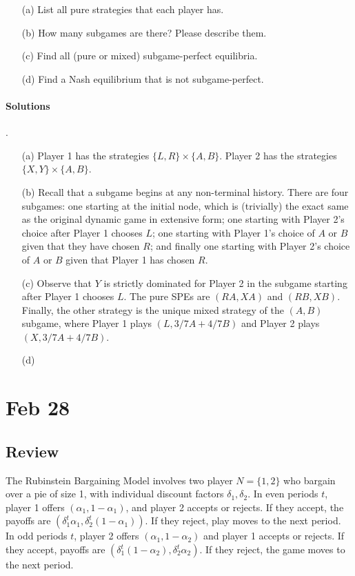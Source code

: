 \documentclass[10pt]{article}
\begin{document}
\begin{itemize}
	\item[(a)] List all pure strategies that each player has.
	\item[(b)] How many subgames are there? Please describe them.
	\item[(c)] Find all (pure or mixed) subgame-perfect equilibria.
	\item[(d)] Find a Nash equilibrium that is not subgame-perfect.
\end{itemize}

\paragraph{Solutions}.

\begin{itemize}
	\item[(a)] Player 1 has the strategies  $\{L,R\} \times \{A,B\}$. Player 2 has the strategies $\{X,Y\} \times \{A,B\}$.
	\item[(b)] Recall that a subgame begins at any non-terminal history. There are four subgames: one starting at the initial node, which is (trivially) the exact same as the original dynamic game in extensive form; one starting with Player 2's choice after Player 1 chooses $L$; one starting with Player 1's choice of $A$ or $B$ given that they have chosen $R$; and finally one starting with Player 2's choice of $A$ or $B$ given that Player 1 has chosen $R$.
	\item[(c)] Observe that $Y$ is strictly dominated for Player 2 in the subgame starting after Player 1 chooses $L$. The pure SPEs are $(RA,XA)$ and $(RB,XB)$. Finally, the other strategy is the unique mixed strategy of the $(A,B)$ subgame, where Player 1 plays $(L, 3/7 A + 4/7 B)$ and Player 2 plays $(X, 3/7 A + 4/7 B)$.
	\item[(d)] 
\end{itemize}


\section{Feb 28}

\subsection{Review}

\begin{model}
	The Rubinstein Bargaining Model involves two player $N = \{1,2\}$ who bargain over a pie of size 1, with individual discount factors $\delta_1,\delta_2$. In even periods $t$, player 1 offers $(\alpha_1,1-\alpha_1)$, and player 2 accepts or rejects. If they accept, the payoffs are $(\delta_1^t \alpha_1,\delta_2^t(1-\alpha_1))$. If they reject, play moves to the next period. In odd periods $t$, player 2 offers $(\alpha_1,1-\alpha_2)$ and player 1 accepts or rejects. If they accept, payoffs are $(\delta_1^t (1-\alpha_2),\delta_2^t\alpha_2)$. If they reject, the game moves to the next period.
\end{model}
\end{document}
